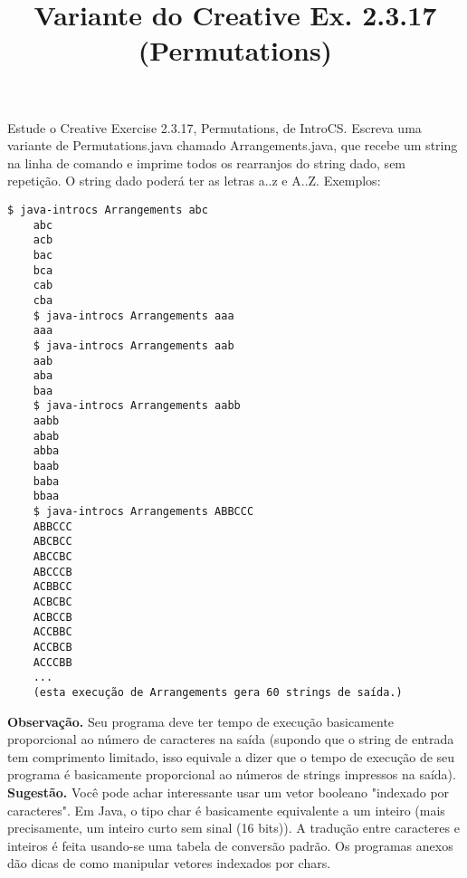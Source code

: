 \documentclass{article}
\title{Variante do Creative Ex. 2.3.17 (Permutations)}
\date{}
\author{}
\begin{document}
\maketitle

Estude o Creative Exercise 2.3.17, Permutations, de IntroCS. Escreva uma variante de Permutations.java chamado Arrangements.java, que recebe um string na linha de comando e imprime todos os rearranjos do string dado, sem repeti\c{c}\~ao. O string dado poder\'a ter as letras a..z e A..Z.
\bigbreak
Exemplos:
\begin{lstlisting}[breaklines, gobble=8]
	$ java-introcs Arrangements abc
	abc
	acb
	bac
	bca
	cab
	cba
	$ java-introcs Arrangements aaa
	aaa
	$ java-introcs Arrangements aab
	aab
	aba
	baa
	$ java-introcs Arrangements aabb
	aabb
	abab
	abba
	baab
	baba
	bbaa
	$ java-introcs Arrangements ABBCCC
	ABBCCC
	ABCBCC
	ABCCBC
	ABCCCB
	ACBBCC
	ACBCBC
	ACBCCB
	ACCBBC
	ACCBCB
	ACCCBB
	...
	(esta execução de Arrangements gera 60 strings de saída.)
\end{lstlisting}
\bigbreak
\textbf{Observa\c{c}\~ao.} Seu programa deve ter tempo de execução basicamente proporcional ao número de caracteres na saída (supondo que o string de entrada tem comprimento limitado, isso equivale a dizer que o tempo de execução de seu programa é basicamente proporcional ao números de strings impressos na saída).
\bigbreak
\textbf{Sugest\~ao.} Voc\^e pode achar interessante usar um vetor booleano "indexado por caracteres".  Em Java, o tipo char \'e basicamente equivalente a um inteiro (mais precisamente, um inteiro curto sem sinal (16 bits)).  A tradu\c{c}\~ao entre caracteres e inteiros \'e feita usando-se uma tabela de convers\~ao padr\~ao.  Os programas anexos d\~ao dicas de como manipular vetores indexados por chars.
\end{document}
